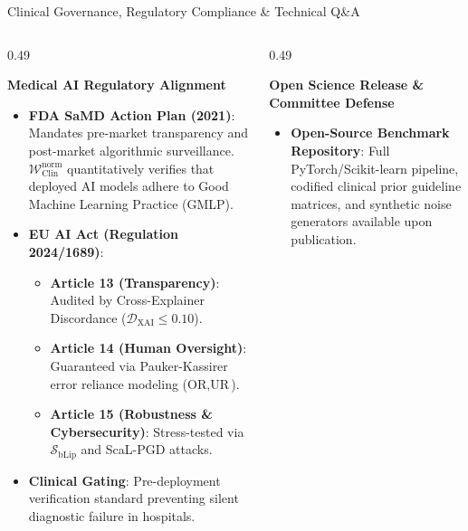 \documentclass[aspectratio=169,10pt]{beamer}
\begin{document}
\begin{frame}{Clinical Governance, Regulatory Compliance \& Technical Q\&A}
  \vspace{-0.1cm}
  \begin{columns}[t]
    \begin{column}{0.49\textwidth}
      \begin{block}{\textbf{Medical AI Regulatory Alignment}}
        \scriptsize
        \begin{itemize}\setlength\itemsep{2pt}
          \item \textbf{FDA SaMD Action Plan (2021)}: Mandates pre-market transparency and post-market algorithmic surveillance. $\mathcal{W}_{\text{Clin}}^{\text{norm}}$ quantitatively verifies that deployed AI models adhere to Good Machine Learning Practice (GMLP).
          \item \textbf{EU AI Act (Regulation 2024/1689)}:
          \begin{itemize}\scriptsize
            \item \textbf{Article 13 (Transparency)}: Audited by Cross-Explainer Discordance ($\mathcal{D}_{\text{XAI}} \le 0.10$).
            \item \textbf{Article 14 (Human Oversight)}: Guaranteed via Pauker-Kassirer error reliance modeling ($\text{OR}, \text{UR}$).
            \item \textbf{Article 15 (Robustness \& Cybersecurity)}: Stress-tested via $\mathcal{S}_{\text{bLip}}$ and ScaL-PGD attacks.
          \end{itemize}
          \item \textbf{Clinical Gating}: Pre-deployment verification standard preventing silent diagnostic failure in hospitals.
        \end{itemize}
      \end{block}
    \end{column}
    \begin{column}{0.49\textwidth}
      \begin{exampleblock}{\textbf{Open Science Release \& Committee Defense}}
        \scriptsize
        \begin{itemize}\setlength\itemsep{3pt}
          \item \textbf{Open-Source Benchmark Repository}:
          Full PyTorch/Scikit-learn pipeline, codified clinical prior guideline matrices, and synthetic noise generators available upon publication.

\end{itemize}
\end{exampleblock}
\end{column}
\end{columns}
\end{frame}
\end{document}
